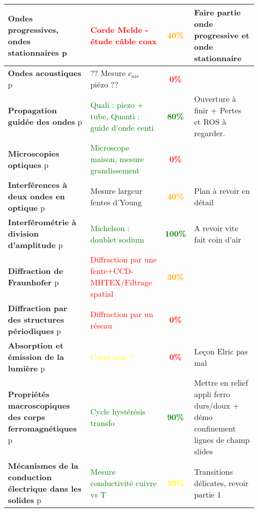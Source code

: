 \begin{changemargin}{-1.5cm}{-0cm}
\begin{center}
\begin{tabularx}{\paperwidth-2cm}{| X | X | c | X |}
\hline
  \textbf{Ondes progressives, ondes stationnaires} p\pageref{LP_OndesProgressives}~& \textcolor{red}{Corde Melde - étude câble coax} & \textcolor{orange}{\textbf{40\%}} & Faire partie onde progressive et onde stationnaire \\
  \hline
  \textbf{Ondes acoustiques} p\pageref{LP_OndeAcoustique}~& ?? Mesure $c_{air}$ piézo ?? & \textcolor{red}{\textbf{0\%}} &  \\
  \hline
  \textbf{Propagation guidée des ondes} p\pageref{LP_PropagationGuidee} & \textcolor{green}{Quali : piezo + tube}, \textcolor{green}{Quanti : guide d'onde centi}& \textcolor{green}{\textbf{80\%}} & Ouverture à finir + Pertes et ROS à regarder. \\
  \hline
  \textbf{Microscopies optiques} p\pageref{LP_Microscopie}~& \textcolor{green}{Microscope maison, mesure grandissement}~& \textcolor{red}{\textbf{0\%}} &  \\
  \hline
  \textbf{Interférences à deux ondes en optique} p\pageref{LP_InterferencesDeuxOndes}~& Mesure largeur fentes d'Young & \textcolor{orange}{\textbf{40\%}} & Plan à revoir en détail\\
  \hline
  \textbf{Interférométrie à division d'amplitude} p\pageref{LP_DivisionAmplitude} & \textcolor{green}{Michelson : doublet sodium} & \textcolor{green}{\textbf{100\%}} & A revoir vite fait coin d'air \\
  \hline
  \textbf{Diffraction de Fraunhofer} p\pageref{LP_DiffractionFraunhofer} & \textcolor{red}{Diffraction par une fente+CCD-MHTEX/Filtrage spatial }& \textcolor{orange}{\textbf{30\%}} &  \\
  \hline
  \textbf{Diffraction par des structures périodiques} p\pageref{LP_DiffractionPeriodique} & \textcolor{red}{Diffraction par un réseau} & \textcolor{red}{\textbf{0\%}} &  \\
  \hline
  \textbf{Absorption et émission de la lumière} p\pageref{LP_Absorption} & \textcolor{yellow}{Corps noir ?} & \textcolor{red}{\textbf{0\%}} & Leçon Elric pas mal \\
  \hline
  \hline
  \textbf{Propriétés macroscopiques des corps ferromagnétiques } p\pageref{LP_Ferromagnetisme} & \textcolor{green}{Cycle hystérésis transfo} & \textcolor{green}{\textbf{90\%}} & Mettre en relief appli ferro durs/doux + démo confinement lignes de champ slides \\
  \hline
  \textbf{Mécanismes de la conduction électrique dans les solides} p\pageref{LP_Conduction} & \textcolor{green}{Mesure conductivité cuivre vs T} & \textcolor{yellow}{\textbf{50\%}} & Transitions délicates, revoir partie 1 \\

\end{tabularx}
\end{center}
\end{changemargin}
